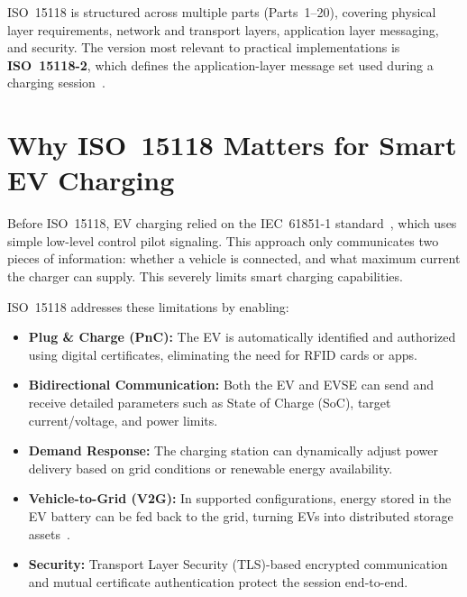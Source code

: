 \documentclass[12pt,a4paper]{report}
\begin{document}
ISO~15118 is structured across multiple parts (Parts~1--20), covering physical layer requirements,
network and transport layers, application layer messaging, and security. The version most relevant
to practical implementations is \textbf{ISO~15118-2}, which defines the application-layer message
set used during a charging session~\autocite{iso15118_2022}.

\section{Why ISO~15118 Matters for Smart EV Charging}

Before ISO~15118, EV charging relied on the IEC~61851-1 standard~\autocite{iec61851_2017}, which uses
simple low-level control pilot signaling. This approach only communicates two pieces of information:
whether a vehicle is connected, and what maximum current the charger can supply. This severely
limits smart charging capabilities.

ISO~15118 addresses these limitations by enabling:

\begin{itemize}
  \item \textbf{Plug \& Charge (PnC):} The EV is automatically identified and authorized using
        digital certificates, eliminating the need for RFID cards or apps.

  \item \textbf{Bidirectional Communication:} Both the EV and EVSE can send and receive detailed
        parameters such as State of Charge (SoC), target current/voltage, and power limits.

  \item \textbf{Demand Response:} The charging station can dynamically adjust power delivery based
        on grid conditions or renewable energy availability.

  \item \textbf{Vehicle-to-Grid (V2G):} In supported configurations, energy stored in the EV
        battery can be fed back to the grid, turning EVs into distributed storage
        assets~\autocite{kempton2005}.

  \item \textbf{Security:} Transport Layer Security (TLS)-based encrypted communication and
        mutual certificate authentication protect the session end-to-end.
\end{itemize}
\end{document}
